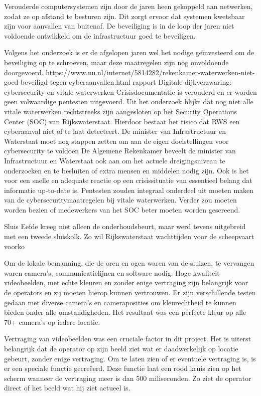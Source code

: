 Verouderde computersystemen zijn door de jaren heen gekoppeld aan netwerken, zodat ze op afstand te besturen zijn. Dit zorgt ervoor dat systemen kwetsbaar zijn voor aanvallen van buitenaf. De beveiliging is in de loop der jaren niet voldoende ontwikkeld om de infrastructuur goed te beveiligen.

Volgens het onderzoek is er de afgelopen jaren wel het nodige geïnvesteerd om de beveiliging op te schroeven, maar deze maatregelen zijn nog onvoldoende doorgevoerd.
https://www.nu.nl/internet/5814282/rekenkamer-waterwerken-niet-goed-beveiligd-tegen-cyberaanvallen.html
\cite{hdsr30092022lichtprojectieswaterliniesluizen}
rapport Digitale dijkverzwaring: cybersecurity en vitale waterwerken 
Crisisdocumentatie is verouderd en er worden geen volwaardige pentesten uitgevoerd. Uit het onderzoek blijkt dat nog niet alle vitale waterwerken rechtstreeks zijn aangesloten op het Security Operations Center (SOC) van Rijkswaterstaat. Hierdoor bestaat het risico dat RWS een cyberaanval niet of te laat detecteert. De minister van Infrastructuur en Waterstaat moet nog stappen zetten om aan de eigen doelstellingen voor cybersecurity te voldoen
De Algemene Rekenkamer beveelt de minister van Infrastructuur en Waterstaat ook aan om het actuele dreigingsniveau te onderzoeken en te besluiten of extra mensen en middelen nodig zijn. Ook is het voor een snelle en adequate reactie op een crisissituatie van essentieel belang dat informatie up-to-date is. Pentesten zouden integraal onderdeel uit moeten maken van de cybersecuritymaatregelen bij vitale waterwerken. Verder zou moeten worden bezien of medewerkers van het SOC beter moeten worden gescreend.

\cite{kramerZeeland}
Sluis Eefde kreeg niet alleen de onderhoudsbeurt, maar werd tevens uitgebreid met een tweede sluiskolk. Zo wil Rijkswaterstaat wachttijden voor de scheepvaart voorko

\cite{gww29032021kantelendesluisdeur}
Om de lokale bemanning, die de oren en ogen waren van de sluizen, te vervangen waren camera’s, communicatielijnen en software nodig. Hoge kwaliteit videobeelden, met echte kleuren en zonder enige vertraging zijn belangrijk voor de operators en zij moeten hierop kunnen vertrouwen. Er zijn verschillende testen gedaan met diverse camera’s en cameraposities om kleurechtheid te kunnen bieden onder alle omstandigheden. Het resultaat was een perfecte kleur op alle 70+ camera’s op iedere locatie.

Vertraging van videobeelden was een cruciale factor in dit project. Het is uiterst belangrijk dat de operator op zijn beeld ziet wat er daadwerkelijk op locatie gebeurt, zonder enige vertraging. Om te laten zien of er eventuele vertraging is, is er een speciale functie gecreëerd. Deze functie laat een rood kruis zien op het scherm wanneer de vertraging meer is dan 500 miliseconden. Zo ziet de operator direct of het beeld wat hij ziet actueel is. 

